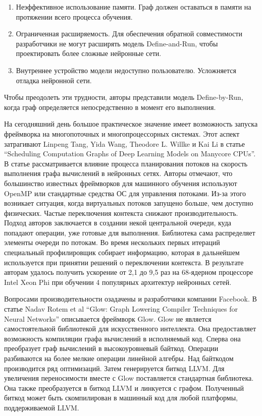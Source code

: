 \begin{enumerate}
	\item Неэффективное использование памяти. Граф должен оставаться в памяти на протяжении всего процесса обучения.
	\item Ограниченная расширяемость. Для обеспечения обратной совместимости разработчики не могут расширять модель Define-and-Run, чтобы проектировать более сложные нейронные сети.
	\item Внутреннее устройство модели недоступно пользователю. Усложняется отладка нейронной сети.
\end{enumerate}
Чтобы преодолеть эти трудности, авторы представили модель Define-by-Run, когда граф определяется непосредственно в момент его выполнения.
\par
На сегодняшний день большое практическое значение имеет возможность запуска фреймворка на многопоточных и многопроцессорных системах. Этот аспект затрагивают Linpeng Tang, Yida Wang, Theodore L. Willke и Kai Li в статье “Scheduling Computation Graphs of Deep Learning Models on Manycore CPUs”\cite{sched1}. В статье рассматривается влияние процесса планирования потоков на скорость выполнения графа вычислений в нейронных сетях. Авторы отмечают, что большинство известных фреймворков для машинного обучения используют OpenMP или стандартные средства ОС для управления потоками. Из-за этого возникает ситуация, когда виртуальных потоков запущено больше, чем доступно физических. Частые переключения контекста снижают производительность. Подход авторов заключается в создании некой центральной очереди, куда попадают операции, уже готовые для выполнения. Библиотека сама распределяет элементы очереди по потокам. Во время нескольких первых итераций специальный профилировщик собирает информацию, которая в дальнейшем используется при принятии решений о переключении контекста. В результате авторам удалось получить ускорение от 2,1 до 9,5 раз на 68-ядерном процессоре Intel Xeon Phi при обучении 4 популярных архитектур нейронных сетей.
\par
Вопросами производительности озадачены и разработчики компании Facebook. В статье Nadav Rotem et al “Glow: Graph Lowering Compiler Techniques for Neural Networks”\cite{glow} описывается фреймворк Glow. Glow не является самостоятельной библиотекой для искусственного интеллекта. Она предоставляет возможность компиляции графа вычислений в исполняемый код. Сперва она преобразует граф вычислений в высокоуровневый байткод. Операции разбиваются на более мелкие операции линейной алгебры. Над байткодом производится ряд оптимизаций. Затем генерируется биткод LLVM. Для увеличения переносимости вместе с Glow поставляется стандартная библиотека. Она также преобразуется в биткод LLVM и линкуется с графом. Полученный биткод может быть скомпилирован в машинный код для любой платформы, поддерживаемой LLVM.
